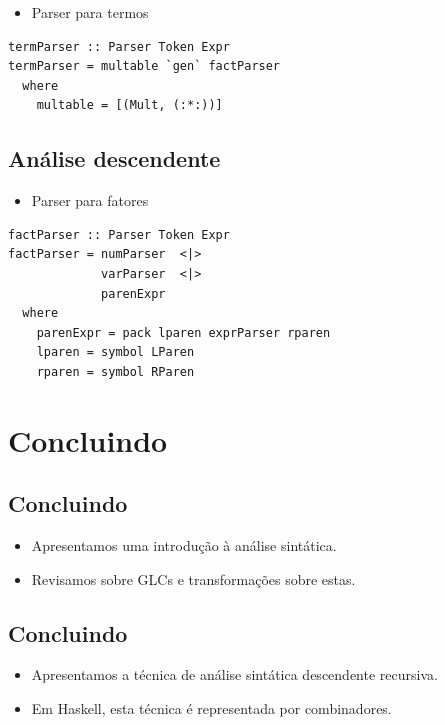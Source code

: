 \documentclass[11pt]{article}
\begin{document}
\begin{itemize}
\item Parser para termos
\end{itemize}

\begin{verbatim}
termParser :: Parser Token Expr
termParser = multable `gen` factParser
  where
    multable = [(Mult, (:*:))]
\end{verbatim}
\subsection*{Análise descendente}
\label{sec:org3112ef0}

\begin{itemize}
\item Parser para fatores
\end{itemize}

\begin{verbatim}
factParser :: Parser Token Expr
factParser = numParser  <|>
             varParser  <|>
             parenExpr
  where
    parenExpr = pack lparen exprParser rparen
    lparen = symbol LParen
    rparen = symbol RParen
\end{verbatim}
\section*{Concluindo}
\label{sec:org89b8f78}

\subsection*{Concluindo}
\label{sec:org5692da5}

\begin{itemize}
\item Apresentamos uma introdução à análise sintática.

\item Revisamos sobre GLCs e transformações sobre estas.
\end{itemize}
\subsection*{Concluindo}
\label{sec:org679a980}

\begin{itemize}
\item Apresentamos a técnica de análise sintática descendente recursiva.

\item Em Haskell, esta técnica é representada por combinadores.
\end{itemize}
\end{document}
